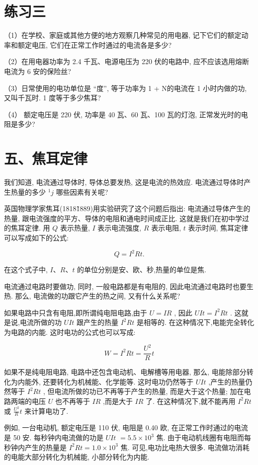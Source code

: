 \documentclass[10pt]{article}
\begin{document}
\section*{练习三}

（1）在学校、家庭或其他方便的地方观察几种常见的用电器, 记下它们的额定动率和额定电压, 它们在正常工作时通过的电流各是多少?

（2）在用电器功率为 2.4 千瓦、电源电压为 220 伏的电路中, 应不应该选用熔断电流为 6 安的保险丝?

（3）日常使用的电功单位是 “度”, 等于功率为 1 + N的电流在 1 小时内做的功, 又叫千瓦时. 1 度等于多少焦耳?

（4） 额定电压是 220 伏, 功率是 40 瓦、60 瓦、100 瓦的灯泡, 正常发光时的电阻是多少?

\section*{五、焦耳定律}

我们知道, 电流通过导体时, 导体总要发热, 这是电流的热效应. 电流通过导体时产生热量的多少 \({}^{1}j\) 哪些因素有关呢?

英国物理学家焦耳(1818\~1889)用实验研究了这个问题后指出: 电流通过导体产生的热量, 跟电流强度的平方、导体的电阻和通电时间成正比. 这就是我们在初中学过的焦耳定律. 用 \(Q\) 表示热量, \(I\) 表示电流强度, \(R\) 表示电阻, \(t\) 表示时间, 焦耳定律可以写成如下的公式:

\[
Q = {I}^{2}{Rt}\text{.}
\]

在这个式子中, \(I\text{、}R\text{、}t\) 的单位分别是安、欧、秒,热量的单位是焦.

电流通过电路时要做功, 同时, 一般电路都是有电阻的, 因此电流通过电路时也要生热. 那么, 电流做的功跟它产生的热之间, 又有什么关系呢?

如果电路中只含有电阻,即所谓纯电阻电路,由于 \(U = {IR}\) , 因此 \({UIt} = {I}^{2}{Rt}\) . 这就是说,电流所做的功 \({UIt}\) 跟产生的热量 \({I}^{2}{Rt}\) 是相等的. 在这种情况下,电能完全转化为电路的内能. 这时电功的公式也可以写成:

\[
W = {I}^{2}{Rt} = \frac{{U}^{2}}{R}t
\]

如果不是纯电阻电路, 电路中还包含电动机、电解槽等用电器, 那么, 电能除部分转化为内能外, 还要转化为机械能、化学能等. 这时电功仍然等于 \({UIt}\) ,产生的热量仍然等于 \({I}^{2}{Rt}\) , 但电流所做的功已不再等于产生的热量, 而是大于这个热量; 加在电路两端的电压 \(U\) 也不再等于 \({IR}\) ,而是大于 \({IR}\) 了. 在这种情况下,就不能再用 \({I}^{2}{Rt}\) 或 \(\frac{{U}^{2}}{R}t\) 来计算电功了.

例如, 一台电动机, 额定电压是 110 伏, 电阻是 0.40 欧, 在正常工作时通过的电流是 50 安. 每秒钟内电流做的功是 \({UIt}\) \(= {5.5} \times {10}^{3}\) 焦. 由于电动机线圈有电阻而每秒钟内产生的热量是 \({I}^{2}{Rt} = {1.0} \times {10}^{3}\) 焦. 可见,电功比电热大很多. 电流做功消耗的电能大部分转化为机械能, 小部分转化为内能.
\end{document}

